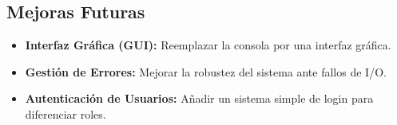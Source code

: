 \documentclass[12pt, letterpaper]{article}
\begin{document}
\subsection{Mejoras Futuras}
\begin{itemize}
    \item \textbf{Interfaz Gráfica (GUI):} Reemplazar la consola por una interfaz gráfica.
    \item \textbf{Gestión de Errores:} Mejorar la robustez del sistema ante fallos de I/O.
    \item \textbf{Autenticación de Usuarios:} Añadir un sistema simple de login para diferenciar roles.
\end{itemize}


\newpage
\printbibliography[title={Bibliografía}]
\end{document}
